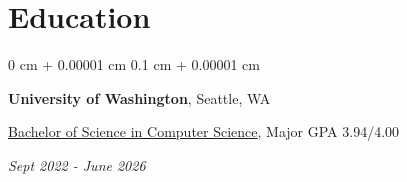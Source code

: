 \documentclass[10pt, letterpaper]{article}
\newenvironment{highlightsforbulletentries}{
    \begin{itemize}[
        topsep=0.10 cm,
        parsep=0.10 cm,
        partopsep=0pt,
        itemsep=0pt,
        leftmargin=10pt
    ]
}{
    \end{itemize}
} %
\newenvironment{onecolentry}{
    \begin{adjustwidth}{
        0 cm + 0.00001 cm
    }{
        0.1 cm + 0.00001 cm
    }
}{
    \end{adjustwidth}
} %
\newenvironment{twocolentry}[2][]{
    \onecolentry
    \def\secondColumn{#2}
    \setcolumnwidth{\fill, 4.5 cm}
    \begin{paracol}{2}
}{
    \switchcolumn \raggedleft \secondColumn
    \end{paracol}
    \endonecolentry
} %
\let\hrefWithoutArrow\href
\renewcommand{\href}[2]{\hrefWithoutArrow{#1}{\ifthenelse{\equal{#2}{}}{ }{#2 }\raisebox{.15ex}{\footnotesize \faExternalLink*}}}
\begin{document}

    









    \section{Education}



        
        \begin{twocolentry}{
            
            
        \textit{Sept 2022 - June 2026}}
            \textbf{University of Washington}, Seattle, WA

            \underline{Bachelor of Science in Computer Science}, Major GPA 3.94/4.00
        \end{twocolentry}
\end{document}
